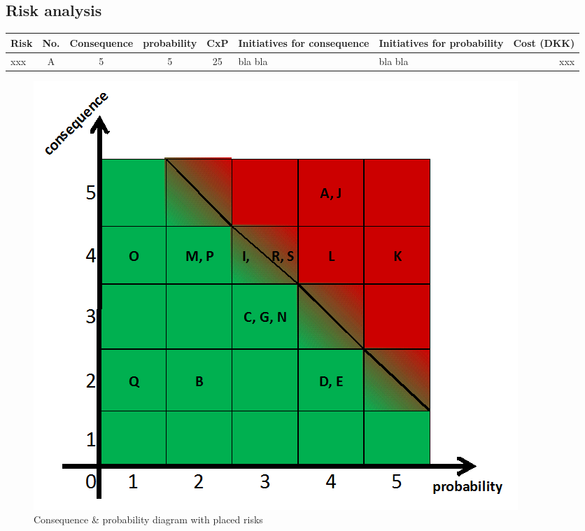 \subsection{Risk analysis}
\label{risk}

\begin{table}[h!]
\centering
\scriptsize
\begin{tabular}[0.8\textswidth]{|l |c |c |c |c |p{2.8cm} |p{2.8cm} |r|}
\hline
Risk 	&	No.	& Consequence	& probability	& CxP	& Initiatives \newline for consequence	& Initiatives \newline for probability	& 	Cost (DKK) \\
\hline
xxx		& A		&	5			&		5		& 25	&	bla bla					&		bla bla					&	xxx\\
\hline
\end{tabular}
\end{table}

\begin{figure}[h!]
\centering
\label{cxp}
\includegraphics[scale=0.4]{./graphics/cxp}
\caption{Consequence \& probability diagram with placed risks}
\end{figure}

